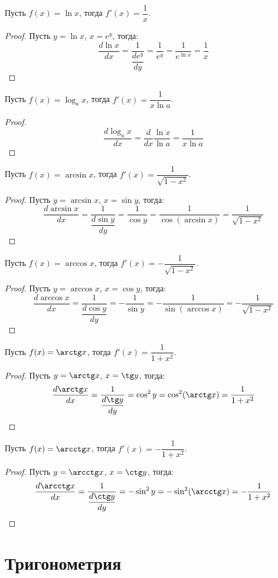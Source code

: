 \documentclass[12pt]{article}
\begin{document}
\begin{statement}
    Пусть $f(x)=\ln x$, тогда $f'(x)=\dfrac{1}{x}$.
\end{statement}
\begin{proof}
    Пусть $y=\ln x$, $x=e^y$, тогда:
    $$\frac{d\ln x}{dx}=\frac{1}{\dfrac{de^y}{dy}}=\frac{1}{e^y}=\frac{1}{e^{\ln x}}=\frac{1}{x}$$
\end{proof}
\begin{statement}
    Пусть $f(x)=\log_a x$, тогда $f'(x)=\dfrac{1}{x\ln a}$.
\end{statement}
\begin{proof}
    $$\frac{d\log_a x}{dx}=\frac{d}{dx}\frac{\ln x}{\ln a}=\frac{1}{x\ln a}$$
\end{proof}
\begin{statement}
    Пусть $f(x)=\arcsin x$, тогда $f'(x)=\dfrac{1}{\sqrt{1-x^2}}$.
\end{statement}
\begin{proof}
    Пусть $y=\arcsin x$, $x=\sin y$, тогда:
    $$\frac{d\arcsin x}{dx}=\frac{1}{\dfrac{d\sin y}{dy}}=\frac{1}{\cos y}=\frac{1}{\cos(\arcsin x)}=\frac{1}{\sqrt{1-x^2}}$$
\end{proof}
\begin{statement}
    Пусть $f(x)=\arccos x$, тогда $f'(x)=-\dfrac{1}{\sqrt{1-x^2}}$.
\end{statement}
\begin{proof}
    Пусть $y=\arccos x$, $x=\cos y$, тогда:
    $$\frac{d\arccos x}{dx}=\frac{1}{\dfrac{d\cos y}{dy}}=-\frac{1}{\sin y}=-\frac{1}{\sin(\arccos x)}=-\frac{1}{\sqrt{1-x^2}}$$
\end{proof}
\begin{statement}
    Пусть $f(x)=\arctg x$, тогда $f'(x)=\dfrac{1}{1+x^2}$.
\end{statement}
\begin{proof}
    Пусть $y=\arctg x$, $x=\tg y$, тогда:
    $$\frac{d\arctg x}{dx}=\frac{1}{\dfrac{d\tg y}{dy}}=\cos^2y=\cos^2(\arctg x)=\frac{1}{1+x^2}$$
\end{proof}
\begin{statement}
    Пусть $f(x)=\arcctg x$, тогда $f'(x)=-\dfrac{1}{1+x^2}$.
\end{statement}
\begin{proof}
    Пусть $y=\arcctg x$, $x=\ctg y$, тогда:
    $$\frac{d\arcctg x}{dx}=\frac{1}{\dfrac{d\ctg y}{dy}}=-\sin^2y=-\sin^2(\arcctg x)=-\frac{1}{1+x^2}$$
\end{proof}

\section{Тригонометрия}
\end{document}

